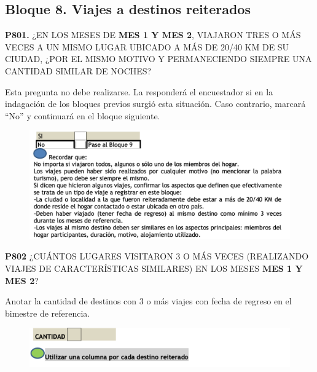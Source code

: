 \documentclass[
  openany]{book}
\begin{document}
\hypertarget{bloque-8.-viajes-a-destinos-reiterados}{%
\subsection{Bloque 8. Viajes a destinos reiterados}\label{bloque-8.-viajes-a-destinos-reiterados}}

\textbf{P801.} ¿EN LOS MESES DE \textbf{MES 1 Y MES 2}, VIAJARON TRES O MÁS VECES A UN MISMO LUGAR UBICADO A MÁS DE 20/40 KM DE SU CIUDAD, ¿POR EL MISMO MOTIVO Y PERMANECIENDO SIEMPRE UNA CANTIDAD SIMILAR DE NOCHES?

Esta pregunta no debe realizarse. La responderá el encuestador si en la indagación de los bloques previos surgió esta situación. Caso contrario, marcará ``No'' y continuará en el bloque siguiente.

\begin{figure}

{\centering \includegraphics[width=1\linewidth]{imagenes/figura6-253} 

}

\end{figure}

\textbf{P802} ¿CUÁNTOS LUGARES VISITARON 3 O MÁS VECES (REALIZANDO VIAJES DE CARACTERÍSTICAS SIMILARES) EN LOS MESES \textbf{MES 1 Y MES 2}?

Anotar la cantidad de destinos con 3 o más viajes con fecha de regreso en el bimestre de referencia.

\begin{figure}

{\centering \includegraphics[width=1\linewidth]{imagenes/figura6-254} 

}

\end{figure}
\end{document}
